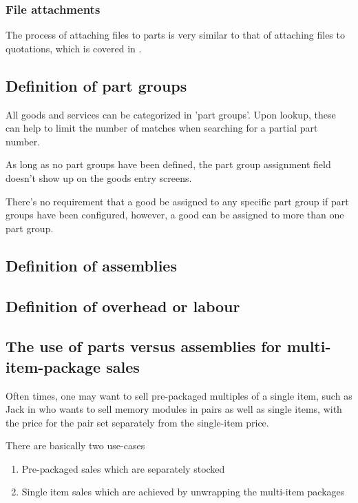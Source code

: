 \subsubsection{File attachments}

The process of attaching files to parts is very similar to that of
attaching files to quotations, which is covered in .

\subsection{Definition of part groups}

All goods and services can be categorized in 'part groups'. Upon lookup, these can
help to limit the number of matches when searching for a partial part number.

As long as no part groups have been defined, the part group assignment field doesn't
show up on the goods entry screens.

There's no requirement that a good be assigned to any specific part group if part
groups have been configured, however, a good can be assigned to more than one part group.

\subsection{Definition of assemblies}



\subsection{Definition of overhead or labour}


\subsection{The use of parts versus assemblies for multi-item-package sales}
\label{subsec:parts-vs-assemblies-for-package-sales}

Often times, one may want to sell pre-packaged multiples of a single item, such as Jack
in  who wants to sell memory modules in pairs as well as
single items, with the price for the pair set separately from the single-item price.

There are basically two use-cases

\begin{enumerate}
\item Pre-packaged sales which are separately stocked
\item Single item sales which are achieved by unwrapping the multi-item packages
\end{enumerate}

